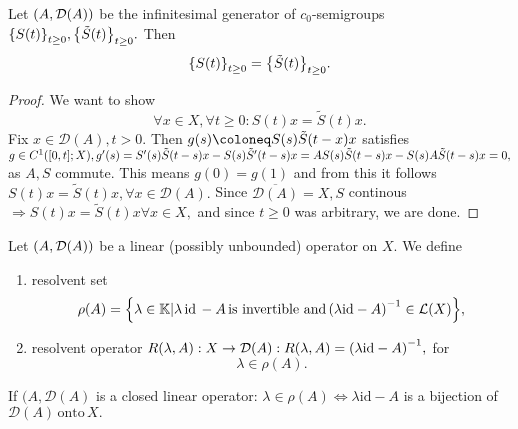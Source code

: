 \documentclass{article}
\begin{document}
\begin{lemma}
	Let $\qty(A, \mathcal{D}(A))$ be the infinitesimal generator of $c_0$-semigroups $\qty{S(t)}_{t\geq0}, \qty{\tilde{S}(t)}_{t\geq 0}.$ Then
	\[
		\qty{S(t)}_{t\geq 0} = \qty{\tilde{S}(t)}_{t \geq 0}.
	\]
\end{lemma}
\begin{proof}
    We want to show
    \[
	    \forall x \in X, \forall t\geq 0: S(t)x = \tilde{S}(t)x.
    \]
    Fix $x \in \mathcal{D}(A), t >0.$ Then $g(s) \coloneq S(s) \tilde{S}\qty(t-x)x$ satisfies $g \in C^1\qty([0,t];X), g'(s) = S'(s)\tilde{S}(t-s)x - S(s) \tilde{S}'(t-s)x = AS(s) \tilde{S}(t-s)x - S(s) A \tilde{S}\qty(t-s)x = 0,$ as $A,S$ commute. This means $g(0) = g(1)$ and from this it follows $S(t)x = \tilde{S}(t)x, \forall x \in \mathcal{D}(A).$ Since $\overline{\mathcal{D}(A)} = X, S$ continous $\Rightarrow S(t)x = \tilde{S}(t)x \forall x \in X, $ and since $t \geq 0$ was arbitrary, we are done.
\end{proof}

\begin{definition}
	Let $\qty(A, \mathcal{D}(A))$ be a linear (possibly unbounded) operator on $X$. We define 
	\begin{enumerate}
		\item resolvent set
			\[
				\rho(A) = \qty{\lambda \in \mathbb{K}| \lambda \, \text{id} \, - A \, \text{is invertible and} \, \qty(\lambda \text{id} - A)^{-1} \in \mathcal{L}(X)},
			\]
		\item resolvent operator $R(\lambda, A):X \to \mathcal{D}(A): R\qty(\lambda, A) =\qty(\lambda \text{id} - A)^{-1},$ for
			\[
				\lambda \in \rho(A).
			\]
	\end{enumerate}
	\end{definition}
\begin{remark}
	If $(A, \mathcal{D}(A)$ is a closed linear operator: $\lambda \in \rho(A) \Leftrightarrow \lambda \text{id} - A$ is a bijection of $\mathcal{D}(A) \, \text{onto} \, X.$
\end{remark}
\end{document}
